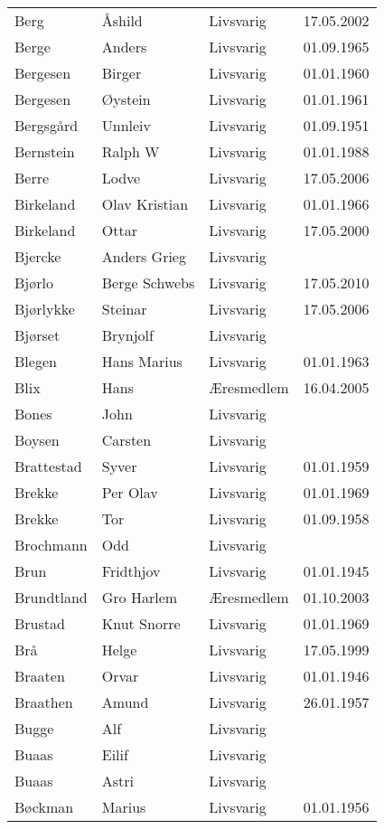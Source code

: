 \documentclass[fsbok.tex]{subfiles}
\begin{document}
\begin{longtable}{llll}
Berg 	&	Åshild	&	Livsvarig	&	17.05.2002	\\
Berge	&	Anders	&	Livsvarig 	&	01.09.1965	\\
Bergesen	&	Birger	&	Livsvarig 	&	01.01.1960	\\
Bergesen	&	Øystein	&	Livsvarig 	&	01.01.1961	\\
Bergsgård	&	Unnleiv	&	Livsvarig 	&	01.09.1951	\\
Bernstein	&	Ralph W	&	Livsvarig 	&	01.01.1988	\\
Berre	&	Lodve	&	Livsvarig	&	17.05.2006	\\
Birkeland	&	Olav Kristian	&	Livsvarig 	&	01.01.1966	\\
Birkeland	&	Ottar	&	Livsvarig	&	17.05.2000	\\
Bjercke	&	Anders Grieg	&	Livsvarig 	&		\\
Bjørlo	&	Berge Schwebs	&	Livsvarig	&	17.05.2010	\\
Bjørlykke	&	Steinar	&	Livsvarig	&	17.05.2006	\\
Bjørset	&	Brynjolf	&	Livsvarig 	&		\\
Blegen	&	Hans Marius	&	Livsvarig 	&	01.01.1963	\\
Blix	&	Hans	&	Æresmedlem	&	16.04.2005	\\
Bones	&	John	&	Livsvarig 	&		\\
Boysen	&	Carsten	&	Livsvarig 	&		\\
Brattestad	&	Syver	&	Livsvarig 	&	01.01.1959	\\
Brekke	&	Per Olav	&	Livsvarig 	&	01.01.1969	\\
Brekke	&	Tor	&	Livsvarig 	&	01.09.1958	\\
Brochmann	&	Odd	&	Livsvarig 	&		\\
Brun	&	Fridthjov	&	Livsvarig 	&	01.01.1945	\\
Brundtland 	&	Gro Harlem 	&	Æresmedlem	&	01.10.2003	\\
Brustad	&	Knut Snorre	&	Livsvarig 	&	01.01.1969	\\
Brå 	&	Helge	&	Livsvarig	&	17.05.1999	\\
Braaten	&	Orvar	&	Livsvarig 	&	01.01.1946	\\
Braathen	&	Amund	&	Livsvarig 	&	26.01.1957	\\
Bugge	&	Alf	&	Livsvarig 	&		\\
Buaas	&	Eilif	&	Livsvarig 	&		\\
Buaas	&	Astri	&	Livsvarig 	&		\\
Bøckman	&	Marius	&	Livsvarig 	&	01.01.1956	\\

\end{longtable}
\end{document}

